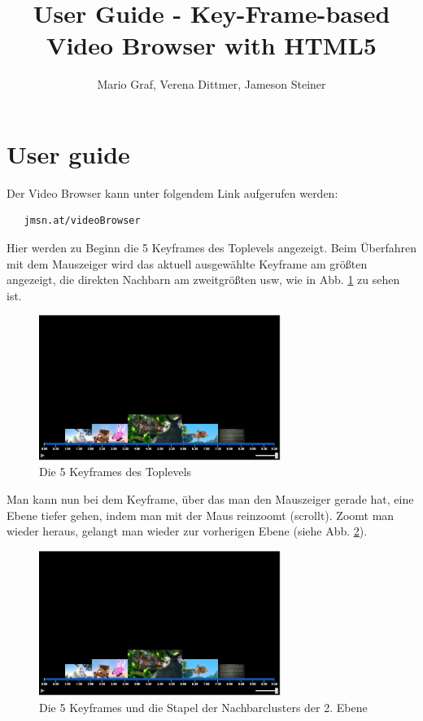 \documentclass[a4paper,11pt,german]{scrartcl}
\title{User Guide - Key-Frame-based Video Browser with HTML5}
\author{Mario Graf, Verena Dittmer, Jameson Steiner}
\begin{document}
\maketitle

\section*{User guide}
Der Video Browser kann unter folgendem Link aufgerufen werden:
\begin{lstlisting}
   jmsn.at/videoBrowser
\end{lstlisting}
Hier werden zu Beginn die 5 Keyframes des Toplevels angezeigt. 
Beim Überfahren mit dem Mauszeiger wird das aktuell ausgewählte Keyframe am größten angezeigt, die direkten Nachbarn am zweitgrößten usw, wie in Abb. \ref{beginning} zu sehen ist.

\begin{figure}[ht!]
	\centering
  	\includegraphics[width=0.7\textwidth]{videoBrowserBeginning.png}
	\caption{Die 5 Keyframes des Toplevels}
	\label{beginning}
\end{figure}

Man kann nun bei dem Keyframe, über das man den Mauszeiger gerade hat, eine Ebene tiefer gehen, indem man mit der Maus reinzoomt (scrollt). Zoomt man wieder heraus, gelangt man wieder zur vorherigen Ebene (siehe Abb. \ref{zoomedIn}). 

\begin{figure}[ht!]
	\centering
  	\includegraphics[width=0.7\textwidth]{videoBrowserBeginning.png} %
	\caption{Die 5 Keyframes und die Stapel der Nachbarclusters der 2. Ebene}
	\label{zoomedIn}
\end{figure}
\end{document}
